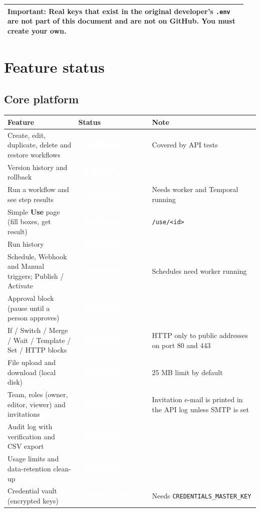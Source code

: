 \documentclass[11pt,a4paper]{article}
\newcommand{\sWork}{\colorbox{okc}{\textcolor{white}{\scriptsize\bfseries\ WORKING\ }}}
\newcommand{\sSetup}{\colorbox{setupc}{\textcolor{white}{\scriptsize\bfseries\ NEEDS\ SETUP\ }}}
\newcommand{\env}[1]{\texttt{#1}}
\newenvironment{important}
  {\par\smallskip\noindent\begin{tabular}{|p{0.95\linewidth}|}\hline\rowcolor{noteg}\vspace{2pt}\textbf{Important: }}
  {\vspace{2pt}\\\hline\end{tabular}\par\smallskip}
\begin{document}
\begin{important}
Real keys that exist in the original developer's \texttt{.env} are not part of this
document and are not on GitHub. You must create your own.
\end{important}

\section{Feature status}

\subsection{Core platform}

\begin{longtable}{@{}L{4.6cm}L{2.6cm}L{8.4cm}@{}}
\toprule
\textbf{Feature} & \textbf{Status} & \textbf{Note} \\
\midrule
\endhead
Create, edit, duplicate, delete and restore workflows & \sWork & Covered by API tests \\
Version history and rollback & \sWork & \\
Run a workflow and see step results & \sWork & Needs worker and Temporal running \\
Simple \textbf{Use} page (fill boxes, get result) & \sWork & \texttt{/use/<id>} \\
Run history & \sWork & \\
Schedule, Webhook and Manual triggers; Publish / Activate & \sWork & Schedules need worker running \\
Approval block (pause until a person approves) & \sWork & \\
If / Switch / Merge / Wait / Template / Set / HTTP blocks & \sWork & HTTP only to public addresses on port 80 and 443 \\
File upload and download (local disk) & \sWork & 25 MB limit by default \\
Team, roles (owner, editor, viewer) and invitations & \sWork & Invitation e-mail is printed in the API log unless SMTP is set \\
Audit log with verification and CSV export & \sWork & \\
Usage limits and data-retention clean-up & \sWork & \\
Credential vault (encrypted keys) & \sSetup & Needs \env{CREDENTIALS\_MASTER\_KEY} \\
\bottomrule
\end{longtable}
\end{document}

